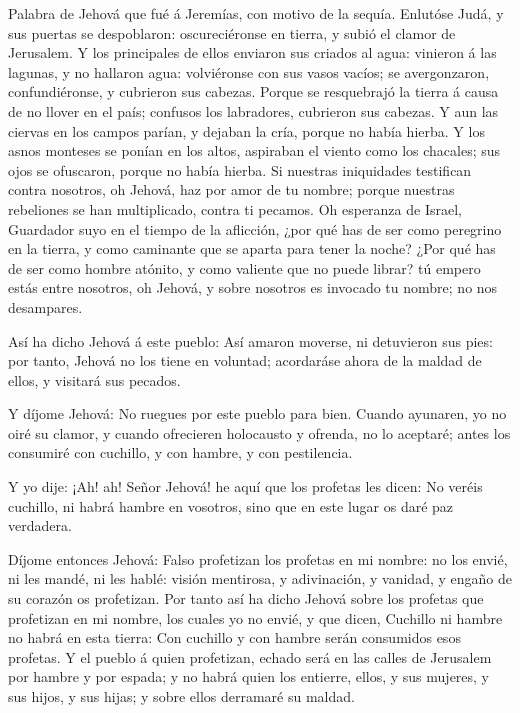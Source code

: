  Palabra de Jehová que fué á Jeremías, con motivo de la
sequía.  Enlutóse Judá, y sus puertas se despoblaron:
oscureciéronse en tierra, y subió el clamor de Jerusalem.  Y
los principales de ellos enviaron sus criados al agua: vinieron á las
lagunas, y no hallaron agua: volviéronse con sus vasos vacíos; se
avergonzaron, confundiéronse, y cubrieron sus cabezas. 
Porque se resquebrajó la tierra á causa de no llover en el país;
confusos los labradores, cubrieron sus cabezas.  Y aun las
ciervas en los campos parían, y dejaban la cría, porque no había hierba.
 Y los asnos monteses se ponían en los altos, aspiraban el
viento como los chacales; sus ojos se ofuscaron, porque no había hierba.
 Si nuestras iniquidades testifican contra nosotros, oh
Jehová, haz por amor de tu nombre; porque nuestras rebeliones se han
multiplicado, contra ti pecamos.  Oh esperanza de Israel,
Guardador suyo en el tiempo de la aflicción, ¿por qué has de ser como
peregrino en la tierra, y como caminante que se aparta para tener la
noche?  ¿Por qué has de ser como hombre atónito, y como
valiente que no puede librar? tú empero estás entre nosotros, oh Jehová,
y sobre nosotros es invocado tu nombre; no nos desampares.

 Así ha dicho Jehová á este pueblo: Así amaron moverse, ni
detuvieron sus pies: por tanto, Jehová no los tiene en voluntad;
acordaráse ahora de la maldad de ellos, y visitará sus pecados.

 Y díjome Jehová: No ruegues por este pueblo para bien.
 Cuando ayunaren, yo no oiré su clamor, y cuando ofrecieren
holocausto y ofrenda, no lo aceptaré; antes los consumiré con cuchillo,
y con hambre, y con pestilencia.

 Y yo dije: ¡Ah! ah! Señor Jehová! he aquí que los profetas
les dicen: No veréis cuchillo, ni habrá hambre en vosotros, sino que en
este lugar os daré paz verdadera.

 Díjome entonces Jehová: Falso profetizan los profetas en
mi nombre: no los envié, ni les mandé, ni les hablé: visión mentirosa, y
adivinación, y vanidad, y engaño de su corazón os profetizan.
 Por tanto así ha dicho Jehová sobre los profetas que
profetizan en mi nombre, los cuales yo no envié, y que dicen, Cuchillo
ni hambre no habrá en esta tierra: Con cuchillo y con hambre serán
consumidos esos profetas.  Y el pueblo á quien profetizan,
echado será en las calles de Jerusalem por hambre y por espada; y no
habrá quien los entierre, ellos, y sus mujeres, y sus hijos, y sus
hijas; y sobre ellos derramaré su maldad.

